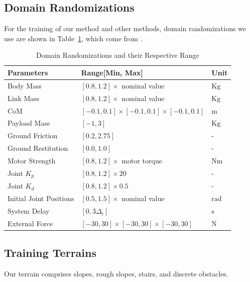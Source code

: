 \subsection{Domain Randomizations}
\label{app:rand}
For the training of our method and other methods, domain randomizations we use are shown in Table~\ref{randomization}, which come from \cite{wu2023learning, nahrendra2023dreamwaq}.

\begin{table}[h]
    \centering
    \caption{Domain Randomizations and their Respective Range}
    \begin{tabular}{lll}
    \toprule[1.5pt] Parameters & Range[Min, Max] & Unit \\
    \midrule[1.5pt]
    Body Mass & {$[0.8,1.2] \times$ nominal value } & $\mathrm{Kg}$ \\
    Link Mass & {$[0.8,1.2] \times$ nominal value } & $\mathrm{Kg}$ \\
    CoM & {$[-0.1,0.1] \times [-0.1,0.1] \times [-0.1,0.1]$} & $\mathrm{m}$ \\
    Payload Mass & {$[-1,3]$} & $\mathrm{Kg}$ \\
    Ground Friction & {$[0.2,2.75]$} & - \\
    Ground Restitution & {$[0.0,1.0]$} & - \\
    Motor Strength & {$[0.8,1.2] \times$ motor torque } & $\mathrm{Nm}$ \\
    Joint $K_p$ & {$[0.8,1.2] \times 20$} & - \\
    Joint $K_d$ & {$[0.8,1.2] \times 0.5$} & - \\
    Initial Joint Positions & {$[0.5,1.5] \times$ nominal value } & $\mathrm{rad}$ \\
    System Delay & {$[0,3\Delta_t]$ } & $\mathrm{s}$ \\
    External Force & {$[-30, 30] \times [-30, 30] \times [-30, 30]$} & $\mathrm{N}$ \\
    \bottomrule[1.5pt]
    \end{tabular}
    \label{randomization}
\end{table}

\newpage
\subsection{Training Terrains}
\label{app:terrain}

Our terrain comprises slopes, rough slopes, stairs, and discrete obstacles. 

